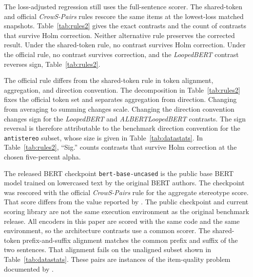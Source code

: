 \documentclass[sigconf,natbib=true,anonymous=true]{acmart}
\begin{document}
\label{sec:scorer}
The loss-adjusted regression still uses the full-sentence scorer. The
shared-token and official \emph{CrowS-Pairs} rules rescore the same items at the
lowest-loss matched snapshots. Table~\ref{tab:rules2} gives the exact contrasts
and the count of contrasts that survive Holm correction. Neither alternative
rule preserves the corrected result. Under the shared-token rule, no contrast
survives Holm correction. Under the official rule, no contrast survives
correction, and the \emph{LoopedBERT} contrast reverses sign,
Table~\ref{tab:rules2}.

The official rule differs from the shared-token rule in token alignment,
aggregation, and direction convention. The decomposition in
Table~\ref{tab:rules2} fixes the official token set and separates aggregation
from direction. Changing from averaging to summing changes scale. Changing the
direction convention changes sign for the \emph{LoopedBERT} and
\emph{ALBERTLoopedBERT} contrasts. The sign reversal is therefore attributable
to the benchmark direction convention for the \texttt{antistereo} subset, whose
size is given in Table~\ref{tab:datastats}. In Table~\ref{tab:rules2},
``Sig.'' counts contrasts that survive Holm correction at the chosen
five-percent alpha.

The released BERT checkpoint \texttt{bert-base-uncased} is the public base BERT
model trained on lowercased text by the original BERT authors. The checkpoint
was rescored with the official \emph{CrowS-Pairs} rule for the aggregate
stereotype score. That score differs from the value reported by
\citet{nangia2020crows}. The public checkpoint and current scoring library are
not the same execution environment as the original benchmark release. All
encoders in this paper are scored with the same code and the same environment,
so the architecture contrasts use a common scorer. The shared-token
prefix-and-suffix alignment matches the common prefix and suffix of the two
sentences. That alignment fails on the unaligned subset shown in
Table~\ref{tab:datastats}. These pairs are instances of the item-quality problem
documented by \citet{blodgett2021salmon}.
\end{document}
